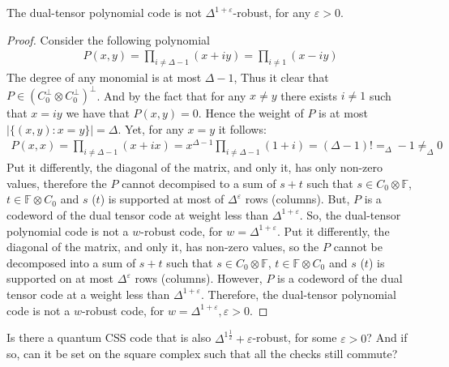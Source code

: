 \begin{claim}
  \label{claim:nowr} The dual-tensor polynomial code is not $\Delta^{1 +\varepsilon}$-robust, for any $\varepsilon > 0$.  
\end{claim}

\begin{proof}
Consider the following polynomial 
  \begin{equation*}
    \begin{split}
      P(x,y) = \prod_{i \neq \Delta - 1}{ \left( x + i y \right)  }=\prod_{i \neq  1}{ \left( x - i y \right)  }  
         \end{split}
  \end{equation*}
  The degree of any monomial is at most $\Delta-1$, Thus it clear that $P \in \left( C_{0}^{\perp} \otimes C_{0}^{\perp} \right)^{\perp}$. And by the fact that for any $x \neq y$ there exists $i\neq 1 $ such that $x = iy$ we have that $P(x,y) = 0$. Hence the weight of $P$ is at most $|\{ (x,y) : x = y \}|= \Delta$. Yet, for any $x = y$ it follows:      
  \begin{equation*}
    \begin{split}
       P(x,x) = \prod_{i \neq \Delta - 1}{ \left( x + i x \right)  }= x^{\Delta-1}\prod_{i \neq \Delta - 1}{ \left( 1 + i \right) } = \left( \Delta-1 \right)!  =_{\Delta} -1  \neq_{\Delta} 0 
    \end{split}
  \end{equation*}
  Put it differently, the diagonal of the matrix, and only it, has only non-zero values, therefore the $P$ cannot decompised to a sum of $s + t$ such that $s \in C_{0}\otimes \mathbb{F}$, $t \in \mathbb{F}\otimes C_{0}$ and $s$ ($t$) is supported at most of $\Delta^{\varepsilon}$ rows (columns). But, $P$ is a codeword of the dual tensor code at weight less than $\Delta^{1 + \varepsilon}$. So, the dual-tensor polynomial code is not a $w$-robust code,  for $w = \Delta^{1 +\varepsilon}$.   
  Put it differently, the diagonal of the matrix, and only it, has non-zero values, so the $P$ cannot be decomposed into a sum of $s + t$ such that $s \in C_{0}\otimes \mathbb{F}$, $t \in \mathbb{F}\otimes C_{0}$ and $s$ ($t$) is supported on at most $\Delta^{\varepsilon}$ rows (columns). However, $P$ is a codeword of the dual tensor code at a weight less than $\Delta^{1 + \varepsilon}$. Therefore, the dual-tensor polynomial code is not a $w$-robust code, for $w = \Delta^{1 +\varepsilon}, \varepsilon> 0 $.
\end{proof}

\begin{openproblem} 
Is there a quantum CSS code that is also $\Delta^{1\frac{1}{2}}+ \varepsilon$-robust, for some $\varepsilon > 0$? And if so, can it be set on the square complex such that all the checks still commute?
\end{openproblem}



